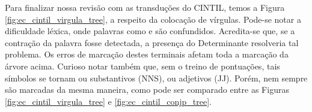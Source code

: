 Para finalizar nossa revisão com as transduções do CINTIL, temos a Figura \ref{fig:ec_cintil_virgula_tree}, a respeito da colocação de vírgulas.
Pode-se notar a dificuldade léxica, onde palavras como  e  são confundidos. Acredita-se que, se a contração da palavra  fosse detectada, a presença do Determinante resolveria tal problema. Os erros de marcação destes terminais afetam toda a marcação da árvore acima. Curioso notar também que, sem o treino de pontuações, tais símbolos se tornam ou substantivos (NNS), ou adjetivos (JJ). Porém, nem sempre são marcadas da mesma maneira, como pode ser comparado entre as Figuras \ref{fig:ec_cintil_virgula_tree} e \ref{fig:ec_cintil_conjp_tree}.
